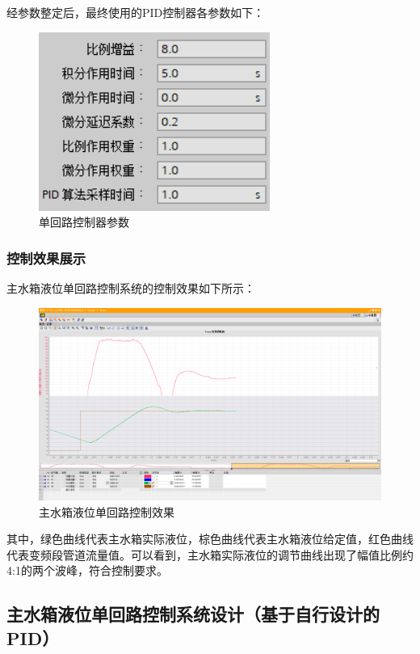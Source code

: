 \documentclass[UTF8]{article}
\begin{document}
经参数整定后，最终使用的PID控制器各参数如下：
\begin{figure}[H]
    \centering %
    \includegraphics[width=.4\textwidth]{figure/单回路-模块-PID参数.png} 
    \caption{单回路控制器参数} %
\end{figure}

\subsubsection{控制效果展示}
主水箱液位单回路控制系统的控制效果如下所示：
\begin{figure}[H]
    \centering %
    \includegraphics[width=1\textwidth]{figure/单回路控制效果-模块.png} 
    \caption{主水箱液位单回路控制效果} %
\end{figure}
其中，绿色曲线代表主水箱实际液位，棕色曲线代表主水箱液位给定值，红色曲线代表变频段管道流量值。可以看到，主水箱实际液位的调节曲线出现了幅值比例约4:1的两个波峰，符合控制要求。

\subsection{主水箱液位单回路控制系统设计（基于自行设计的PID）}
\end{document}
